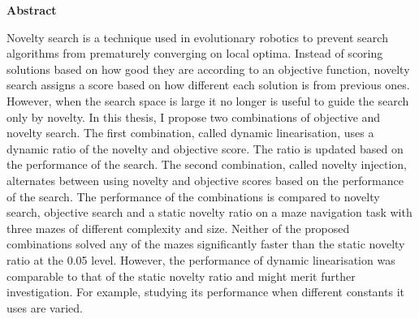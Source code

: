 
\vspace*{3cm}

\begin{center}
	\textbf{Abstract}
\end{center}

{
  Novelty search is a technique used in evolutionary robotics to prevent search algorithms from prematurely
  converging on local optima. Instead of scoring solutions based on how good they are according to an objective
  function, novelty search assigns a score based on how different each solution is from previous ones. However, when the
  search space is large it no longer is useful to guide the search only by novelty. In this thesis, I propose
  two combinations of objective and novelty search. The first combination, called dynamic linearisation, uses
  a dynamic ratio of the novelty and objective score. The ratio is updated based on the performance of the search. The
  second combination, called novelty injection, alternates between using novelty and objective scores based on the performance of
  the search.
  The performance of the combinations is compared to novelty search, objective search and a static novelty ratio on a maze navigation task with
  three mazes of different complexity and size. Neither of the proposed combinations solved any of the mazes significantly
  faster than the static novelty ratio at the 0.05 level. However, the performance of dynamic linearisation was comparable
  to that of the static novelty ratio and might merit further investigation. For example, studying its performance when different
  constants it uses are varied.
}

\thispagestyle{empty}
\newpage